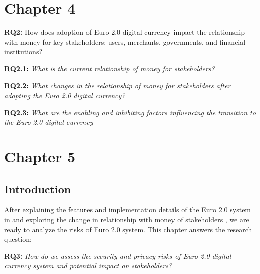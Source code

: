 \documentclass[12pt]{article} %
\newcommand{\hypernameref}[1]{\hyperref[#1]{\nameref{#1}}}
\begin{document}
{

\pagebreak

\section{Chapter 4} \label{sec:4}


\begin{quoting}
	\textbf{RQ2:} How does adoption of Euro 2.0 digital currency impact the relationship with money for key stakeholders: users, merchants, governments, and financial institutions?
\end{quoting}

\begin{quoting}
	\textbf{RQ2.1: }\textit{What is the current relationship of money for stakeholders?}
\end{quoting}
\begin{quoting}
	\textbf{RQ2.2: }\textit{What changes in the relationship of money for stakeholders after adopting the Euro 2.0 digital currency?}
\end{quoting}
\begin{quoting}
	\textbf{RQ2.3: }\textit{What are the enabling and inhibiting factors influencing the transition to the Euro 2.0 digital currency}
\end{quoting}

\pagebreak

\section{Chapter 5} \label{sec:5}

\subsection{Introduction} \label{ssec:5:intro}

After explaining the features and implementation details of the Euro 2.0 system in \hypernameref{sec:3} and exploring the change in relationship with money of stakeholders \hypernameref{sec:4}, we are ready to analyze the risks of Euro 2.0 system. This chapter answers the research question:

\begin{quoting}
	\textbf{RQ3:} \textit{How do we assess the security and privacy risks of Euro 2.0 digital currency system and potential impact on stakeholders?}
\end{quoting}

}
\end{document}
